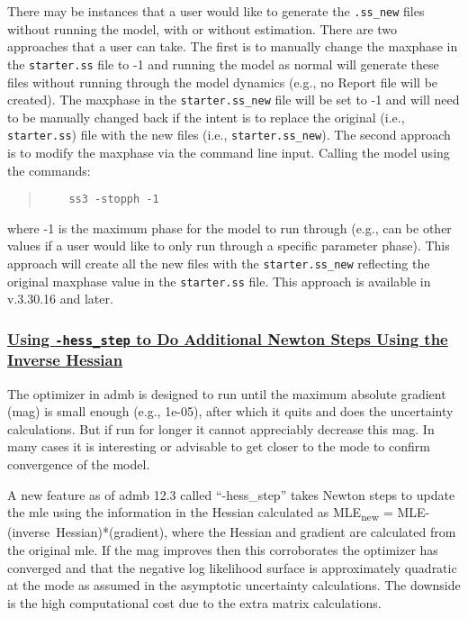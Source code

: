There may be instances that a user would like to generate the \texttt{.ss\_new} files without running the model, with or without estimation. There are two approaches that a user can take. The first is to manually change the maxphase in the \texttt{starter.ss} file to -1 and running the model as normal will generate these files without running through the model dynamics (e.g., no Report file will be created). The maxphase in the \texttt{starter.ss\_new} file will be set to -1 and will need to be manually changed back if the intent is to replace the original (i.e., \texttt{starter.ss}) file with the new files (i.e., \texttt{starter.ss\_new}). The second approach is to modify the maxphase via the command line input. Calling the model using the commands:

\begin{quote}
	\begin{verbatim}
	ss3 -stopph -1
	\end{verbatim}
\end{quote}  

where -1 is the maximum phase for the model to run through (e.g., can be other values if a user would like to only run through a specific parameter phase). This approach will create all the new files with the \texttt{starter.ss\_new} reflecting the original maxphase value in the \texttt{starter.ss} file. This approach is available in v.3.30.16 and later.

\hypertarget{hess-step}{}
\subsubsection[Using \texttt{-hess\_step} to Do Additional Newton Steps Using the Inverse Hessian]{\protect\hyperlink{hess-step}{Using \texttt{-hess\_step} to Do Additional Newton Steps Using the Inverse Hessian}}

The optimizer in \gls{admb} is designed to run until the maximum absolute gradient (mag) is small enough (e.g., 1e-05), after which it quits and does the uncertainty calculations. But if run for longer it cannot appreciably decrease this mag. In many cases it is interesting or advisable to get closer to the mode to confirm convergence of the model. 

A new feature as of \gls{admb} 12.3 called ``-hess\_step'' takes Newton steps to update the \gls{mle} using the information in the Hessian calculated as MLE\textsubscript{new} = MLE-(inverse~Hessian)*(gradient), where the Hessian and gradient are calculated from the original \gls{mle}. If the mag improves then this corroborates the optimizer has converged and that the negative log likelihood surface is approximately quadratic at the mode as assumed in the asymptotic uncertainty calculations. The downside is the high computational cost due to the extra matrix calculations.

